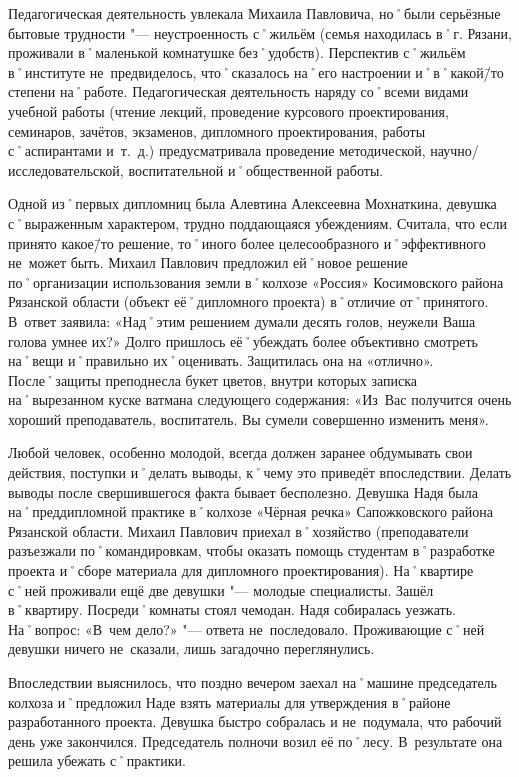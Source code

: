 Педагогическая деятельность увлекала Михаила Павловича, но˚были серьёзные бытовые трудности "--- неустроенность с˚жильём (семья находилась в˚г. Рязани, проживали в˚маленькой комнатушке без˚удобств). Перспектив с˚жильём в˚институте не~предвиделось, что˚сказалось на˚его настроении и˚в˚какой\=/то степени на˚работе.
Педагогическая деятельность наряду со˚всеми видами учебной работы (чтение лекций, проведение курсового проектирования, семинаров, зачётов, экзаменов, дипломного проектирования, работы с˚аспирантами и~т.~д.) предусматривала проведение методической, научно\-/исследовательской, воспитательной и˚общественной работы.

Одной из˚первых дипломниц была Алевтина Алексеевна Мохнаткина, девушка с˚выраженным характером, трудно поддающаяся убеждениям. Считала, что если принято какое\=/то решение, то˚иного более целесообразного и˚эффективного не~может быть. Михаил Павлович предложил ей˚новое решение по˚организации использования земли в˚колхозе «Россия» Косимовского района Рязанской области (объект её˚дипломного проекта) в˚отличие от˚принятого. В~ответ заявила: «Над˚этим решением думали десять голов, неужели Ваша голова умнее их?» Долго пришлось её˚убеждать более объективно смотреть на˚вещи и˚правильно их˚оценивать. Защитилась она на «отлично». После˚защиты преподнесла букет цветов, внутри которых записка на˚вырезанном куске ватмана следующего содержания: «Из~Вас получится очень хороший преподаватель, воспитатель. Вы сумели совершенно изменить меня».

Любой человек, особенно молодой, всегда должен заранее обдумывать свои действия, поступки и˚делать выводы, к˚чему это приведёт впоследствии. Делать выводы после свершившегося факта бывает бесполезно. Девушка Надя была на˚преддипломной практике в˚колхозе «Чёрная речка» Сапожковского района Рязанской области. Михаил Павлович приехал в˚хозяйство (преподаватели разъезжали по˚командировкам, чтобы оказать помощь студентам в˚разработке проекта и˚сборе материала для дипломного проектирования). На˚квартире с˚ней проживали ещё две девушки "--- молодые специалисты. Зашёл в˚квартиру. Посреди˚комнаты стоял чемодан. Надя собиралась уезжать. На˚вопрос: «В~чем дело?» "--- ответа не~последовало. Проживающие с˚ней девушки ничего не~сказали, лишь загадочно переглянулись.

Впоследствии выяснилось, что поздно вечером заехал на˚машине председатель колхоза и˚предложил Наде взять материалы для утверждения в˚районе разработанного проекта. Девушка быстро собралась и не~подумала, что рабочий день уже закончился. Председатель полночи возил её по˚лесу. В~результате она решила убежать с˚практики. 

